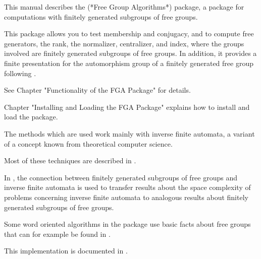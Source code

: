 



This manual describes the {\FGA} (*Free Group Algorithms*) package,
a {\GAP} package for computations with finitely generated subgroups of
free groups.

This package allows you to test membership and conjugacy, and to compute
free generators, the rank, the normalizer, centralizer, and index,
where the groups involved are finitely generated subgroups of free groups.
%
In addition, it provides a finite presentation for the
automorphism group of a finitely generated free group following
\cite{Neumann33}.

See Chapter "Functionality of the FGA Package" for details.

Chapter "Installing and Loading the FGA Package" explains
how to install and load the {\FGA} package.


The methods which are used work mainly with inverse finite automata,
a variant of a concept known from theoretical computer science.

Most of these techniques are described in \cite{Sims94}.

In \cite{BirgetEtAl00}, the connection between finitely generated
subgroups of free groups and inverse finite automata is used to transfer
results about the space complexity of problems concerning inverse finite
automata to analogous results about finitely generated subgroups of free
groups.

Some word oriented algorithms in the {\FGA} package use basic facts about
free groups that can for example be found in \cite{LyndonSchupp77}.

This implementation is documented in \cite{Sievers03}.

